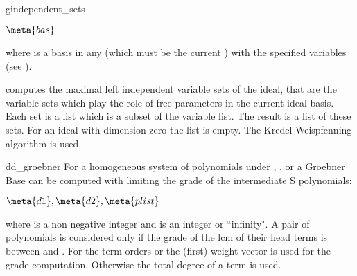 
\begin{Operator}{gindependent\_sets}
\begin{Syntax}

  \(\meta{bas}\)

\end{Syntax}
where  is a  basis in any  
(which must be the current ) with the specified
variables (see ). 


 computes the maximal
left independent variable sets of the ideal, that are 
the variable sets which play the role of free parameters in the
current ideal basis. Each set is a list which is a subset of the
variable list. The result is a list of these sets. For an
ideal with dimension zero the list is empty.
The Kredel-Weispfenning algorithm is used.
\end{Operator}


\begin{Operator}{dd_groebner}
For a homogeneous system of polynomials under 
, , 
or  
a Groebner Base can be computed with limiting the grade
of the intermediate S polynomials: 
\begin{Syntax}
\(\meta{d1},\meta{d2},\meta{plist}\)
\end{Syntax}
where  is a non negative integer and  is an integer
or ``infinity". A pair of polynomials is considered
only if the grade of the lcm of their head terms is between
 and .
For the term orders  or  the (first) weight
vector is used for the grade computation. Otherwise the total
degree of a term is used.
\end{Operator}



